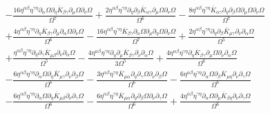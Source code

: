 \documentclass[10pt,letterpaper]{article}
\numberwithin{equation}{section}
\begin{document}
\begin{align}
& -  \frac{16 \eta^{\alpha \beta} \eta^{\gamma \eta} \partial_{\alpha}\Omega \partial_{\eta}\overline{K}_{\beta \gamma} \partial_{\mu}\Omega \partial_{\nu}\Omega}{\Omega^7} + \frac{2 \eta^{\alpha \beta} \eta^{\gamma \eta} \partial_{\eta}\partial_{\beta}\overline{K}_{\alpha \gamma} \partial_{\mu}\Omega \partial_{\nu}\Omega}{\Omega^6} -  \frac{8 \eta^{\alpha \beta} \eta^{\gamma \eta} \overline{K}_{\alpha \gamma} \partial_{\eta}\partial_{\beta}\Omega \partial_{\mu}\Omega \partial_{\nu}\Omega}{\Omega^7} \nonumber \\
&+ \frac{4 \eta^{\alpha \beta} \eta^{\gamma \eta} \partial_{\eta}\overline{K}_{\beta \gamma} \partial_{\mu}\partial_{\alpha}\Omega \partial_{\nu}\Omega}{\Omega^6} -  \frac{16 \eta^{\alpha \beta} \eta^{\gamma \eta} \overline{K}_{\beta \gamma} \partial_{\alpha}\Omega \partial_{\mu}\partial_{\eta}\Omega \partial_{\nu}\Omega}{\Omega^7} + \frac{2 \eta^{\alpha \beta} \eta^{\gamma \eta} \partial_{\eta}\partial_{\beta}\overline{K}_{\mu \gamma} \partial_{\nu}\partial_{\alpha}\Omega}{\Omega^5} \nonumber \\
&+ \frac{\eta^{\alpha \beta} \eta^{\gamma \eta} \partial_{\eta}\partial_{\gamma}\overline{K}_{\mu \beta} \partial_{\nu}\partial_{\alpha}\Omega}{\Omega^5} -  \frac{4 \eta^{\alpha \beta} \eta^{\gamma \eta} \partial_{\eta}\partial_{\mu}\overline{K}_{\beta \gamma} \partial_{\nu}\partial_{\alpha}\Omega}{3 \Omega^5} + \frac{4 \eta^{\alpha \beta} \eta^{\gamma \eta} \partial_{\eta}\overline{K}_{\beta \gamma} \partial_{\mu}\Omega \partial_{\nu}\partial_{\alpha}\Omega}{\Omega^6} \nonumber \\
&-  \frac{6 \eta^{\alpha \beta} \eta^{\gamma \eta} \partial_{\alpha}\Omega \partial_{\eta}\overline{K}_{\mu \gamma} \partial_{\nu}\partial_{\beta}\Omega}{\Omega^6} -  \frac{3 \eta^{\alpha \beta} \eta^{\gamma \eta} \overline{K}_{\mu \alpha} \partial_{\eta}\partial_{\gamma}\Omega \partial_{\nu}\partial_{\beta}\Omega}{\Omega^6} -  \frac{6 \eta^{\alpha \beta} \eta^{\gamma \eta} \partial_{\alpha}\Omega \partial_{\beta}\overline{K}_{\mu \eta} \partial_{\nu}\partial_{\gamma}\Omega}{\Omega^6} \nonumber \\
&-  \frac{6 \eta^{\alpha \beta} \eta^{\gamma \eta} \partial_{\alpha}\Omega \partial_{\eta}\overline{K}_{\mu \beta} \partial_{\nu}\partial_{\gamma}\Omega}{\Omega^6} -  \frac{6 \eta^{\alpha \beta} \eta^{\gamma \eta} \overline{K}_{\mu \alpha} \partial_{\eta}\partial_{\beta}\Omega \partial_{\nu}\partial_{\gamma}\Omega}{\Omega^6} + \frac{4 \eta^{\alpha \beta} \eta^{\gamma \eta} \partial_{\alpha}\Omega \partial_{\mu}\overline{K}_{\beta \eta} \partial_{\nu}\partial_{\gamma}\Omega}{\Omega^6} \nonumber \\

\end{align}
\end{document}
